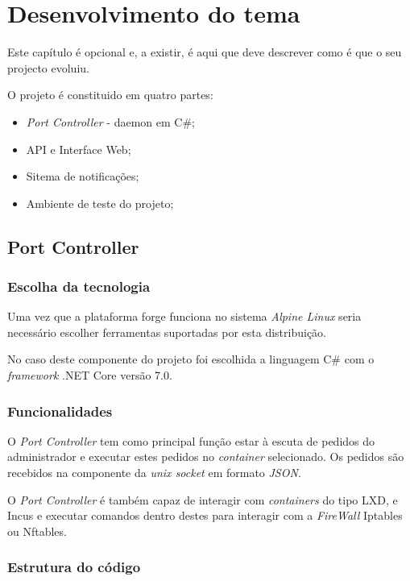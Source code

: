 \chapter{Desenvolvimento do tema}
\label{cap:experiments}

Este capítulo é opcional e, a existir, é aqui que deve descrever como é que o seu projecto evoluiu.

O projeto é constituido em quatro partes:

\begin{itemize}
    \item \textit{Port Controller} - daemon em C\#;
    \item API e Interface Web;
    \item Sitema de notificações;
    \item Ambiente de teste do projeto;
\end{itemize}

\section{Port Controller}

\subsection{Escolha da tecnologia}

Uma vez que a plataforma forge funciona no sistema \textit{Alpine Linux} seria
necessário escolher ferramentas suportadas por esta distribuição.

No caso deste componente do projeto foi escolhida a linguagem C\# com o 
\textit{framework} .NET Core versão 7.0.


\subsection{Funcionalidades}

O \textit{Port Controller} tem como principal função estar à escuta de pedidos do
administrador e executar estes pedidos no \textit{container} selecionado. Os 
pedidos são recebidos na componente da \textit{unix socket} em formato
\textit{JSON}.

O \textit{Port Controller} é também capaz de interagir com \textit{containers}
do tipo LXD, e Incus e executar comandos dentro destes para interagir com a
\textit{FireWall} Iptables ou Nftables.

\subsection{Estrutura do código}


